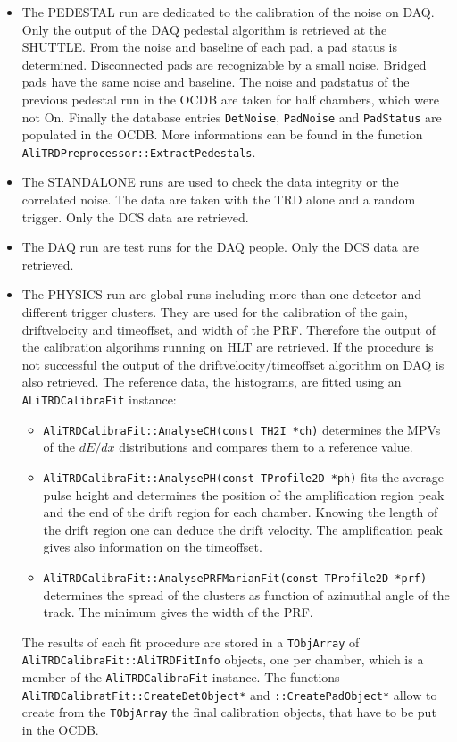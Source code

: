 \documentclass{alicetdr}
\begin{document}
\begin{itemize}
\item The PEDESTAL run are dedicated to the calibration of the noise 
on DAQ. Only the output of the DAQ pedestal algorithm is retrieved at 
the SHUTTLE. From the noise and baseline of each pad, a pad status is 
determined. Disconnected pads are recognizable by a small noise. 
Bridged pads have the same noise and baseline. The noise and 
padstatus of the previous pedestal run in the OCDB are taken for half 
chambers, which were not On. Finally the database entries 
{\tt DetNoise}, {\tt PadNoise} and {\tt PadStatus} are populated in 
the OCDB. More informations can be found in the function 
\\{\tt AliTRDPreprocessor::ExtractPedestals}.
\item The STANDALONE runs are used to check the data integrity or the 
correlated noise. The data are taken with the TRD alone and a random 
trigger. Only the DCS data are retrieved.
\item The DAQ run are test runs for the DAQ people. Only the DCS data 
are retrieved.
\item The PHYSICS run are global runs including more than one detector 
and different trigger clusters. They are used for the calibration of 
the gain, driftvelocity and timeoffset, and width of the PRF. Therefore 
the output of the calibration algorihms running on HLT are retrieved. 
If the procedure is not successful the output of the 
driftvelocity$/$timeoffset algorithm on DAQ is also retrieved. The 
reference data, the histograms, are fitted using an 
{\tt ALiTRDCalibraFit} instance:
\begin{itemize}
\item {\tt AliTRDCalibraFit::AnalyseCH(const TH2I *ch)} determines 
the MPVs of the $dE/dx$ distributions and compares them to a reference 
value.
\item {\tt AliTRDCalibraFit::AnalysePH(const TProfile2D *ph)} fits 
the average pulse height and determines the position of the amplification 
region peak and the end of the drift region for each chamber. Knowing 
the length of the drift region one can deduce the drift velocity. The 
amplification peak gives also information on the timeoffset.   
\item {\tt AliTRDCalibraFit::AnalysePRFMarianFit(const TProfile2D *prf)} 
determines the spread of the clusters as function of azimuthal angle of 
the track. The minimum gives the width of the PRF.
\end{itemize}
The results of each fit procedure are stored in a {\tt TObjArray} of 
\\{\tt AliTRDCalibraFit::AliTRDFitInfo} objects, one per chamber, which 
is a member of the {\tt AliTRDCalibraFit} instance. The functions 
{\tt AliTRDCalibratFit::CreateDetObject*} and {\tt ::CreatePadObject*} 
allow to create from the {\tt TObjArray} the final calibration objects, 
that have to be put in the OCDB.
\end{itemize}
\end{document}
